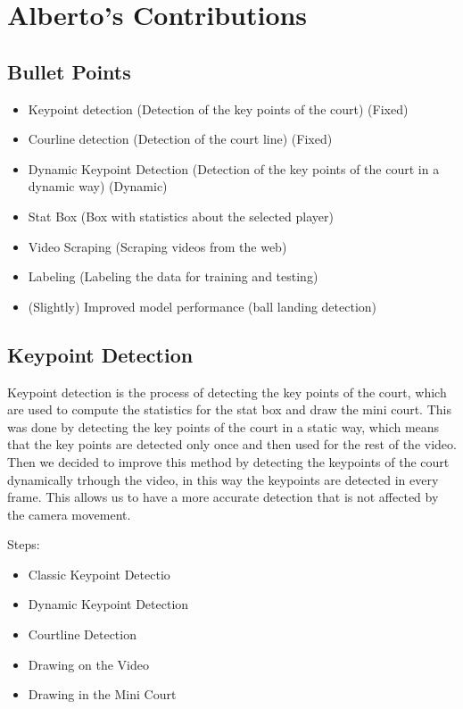 
\section{Alberto's Contributions}

\subsection{Bullet Points}

\begin{itemize}
    \item Keypoint detection (Detection of the key points of the court) (Fixed)
    \item Courline detection (Detection of the court line) (Fixed)
    \item Dynamic Keypoint Detection (Detection of the key points of the court in a dynamic way) (Dynamic)
    \item Stat Box (Box with statistics about the selected player)
    \item Video Scraping (Scraping videos from the web)
    \item Labeling (Labeling the data for training and testing)
    \item (Slightly) Improved model performance (ball landing detection)
\end{itemize}

\subsection{Keypoint Detection}

Keypoint detection is the process of detecting the key points of the court, which are used to compute the statistics for the stat box and draw the mini court.
This was done by detecting the key points of the court in a static way, which means that the key points are detected only once and then used for the rest of the video.
Then we decided to improve this method by detecting the keypoints of the court dynamically trhough the video, in this way the keypoints are detected in every frame.
This allows us to have a more accurate detection that is not affected by the camera movement.

Steps:
\begin{itemize}
    \item Classic Keypoint Detectio
    \item Dynamic Keypoint Detection
    \item Courtline Detection
    \item Drawing on the Video
    \item Drawing in the Mini Court
\end{itemize}

